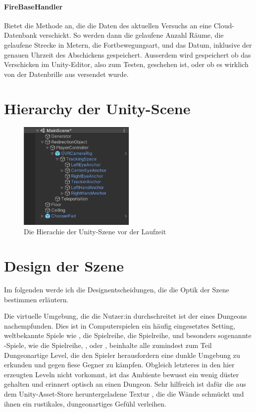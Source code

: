 \begin{multicols*}{2}
    \paragraph{FireBaseHandler}
    Bietet die Methode  an, die die Daten des aktuellen Versuchs an eine Cloud-Datenbank verschickt. So werden dann die gelaufene Anzahl Räume, die gelaufene Strecke in Metern, die Fortbewegungsart, und das Datum, inklusive der genauen Uhrzeit des Abschickens gespeichert. Ausserdem wird gespeichert ob das Verschicken im Unity-Editor, also zum Testen, geschehen ist, oder ob es wirklich von der Datenbrille aus versendet wurde.
\end{multicols*}

\section{Hierarchy der Unity-Scene}

\begin{figure}
    \centering
    \includegraphics[width=0.5\textwidth]{images/hierarchy.png}
    \caption{Die Hierachie der Unity-Szene vor der Laufzeit}
\end{figure}

\section{Design der Szene}
Im folgenden werde ich die Designentscheidungen, die die Optik der Szene bestimmen erläutern.

Die virtuelle Umgebung, die die Nutzer:in durchschreitet ist der eines Dungeons nachempfunden. Dies ist in Computerspielen ein häufig eingesetztes Setting, weltbekannte Spiele wie
, %
die  Spielreihe,
die  Spielreihe,
und besonders sogenannte -Spiele, wie
die  Spielreihe,
,
oder , beinhalte alle zumindest zum Teil Dungeonartige Level, die den Spieler herausfordern eine dunkle Umgebung zu erkunden und gegen fiese Gegner zu kämpfen.
Obgleich letzteres in den hier erzeugten Leveln nicht vorkommt, ist das  Ambiente bewusst ein wenig düster gehalten und erinnert optisch an einen Dungeon. Sehr hilfreich ist dafür die aus dem Unity-Asset-Store heruntergeladene Textur \cite{dungeon-material}, die die Wände schmückt und ihnen ein rustikales, dungeonartiges Gefühl verleihen.


